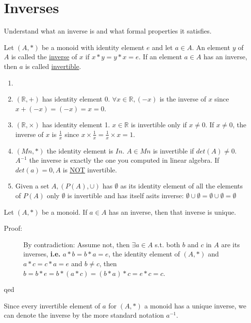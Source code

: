 \documentclass[10pt]{article}
\begin{document}
	\section{Inverses}
	\begin{description}
		\item[Task:] Understand what an inverse is and what formal properties it satisfies.
		\item[Definition:] Let $(A, *)$ be a monoid with identity element $e$ and let $a \in A$. An element $y$ of $A$ is called the \underline{inverse} of $x$ if $x*y = y*x = e$. If an element $a \in A$ has an inverse, then $a$ is called \underline{invertible}.
		\item[Examples:]
		\begin{enumerate}
			\item[]
			\item $(\mathbb{R}, +)$ has identity element 0. $\forall x \in \mathbb{R}, (-x)$ is the inverse of $x$ since $x+(-x)=(-x)=x = 0$.
			\item $(\mathbb{R}, \times)$ has identity element 1. $x \in \mathbb{R}$ is invertible only if $x \neq 0$. If $x \neq 0$, the inverse of $x$ is $\frac{1}{x}$ since $x \times \frac{1}{x} = \frac{1}{x} \times x =1$.
			\item $(Mn, *)$ the identity element is $In$. $A \in Mn$ is invertible if $det(A) \neq 0$. $A^{-1}$ the inverse is exactly the one you computed in linear algebra. If $det(a) = 0, A$ is \underline{NOT} invertible.
			\item Given a set $A, (P(A), \cup)$ has $\emptyset$ as its identity element of all the elements of $P(A)$ only $\emptyset$ is invertible and has itself asits inverse: $\emptyset \cup \emptyset= \emptyset \cup \emptyset = \emptyset$
		\end{enumerate}
		\item[Theorem:] Let $(A, *)$ be a monoid. If $a \in A$ has an inverse, then that inverse is unique.
		\begin{description}
			\item[Proof:] By contradiction: Assume not, then $\exists a \in A$ s.t. both $b$ and $c$ in $A$ are its inverses, \textbf{i.e.} $a*b = b*a = e$, the identity element of $(A, *)$ and $a*c = c*a = e$ and $b \neq c$, then $b = b*e=b*(a*c)=(b*a)*c=e*c=c$.
			\item[qed]
		\end{description}
		\item Since every invertible element of $a$ for $(A, *)$ a monoid has a unique inverse, we can denote the inverse by the more standard notation $a^{-1}$.

\end{description}
\end{document}
